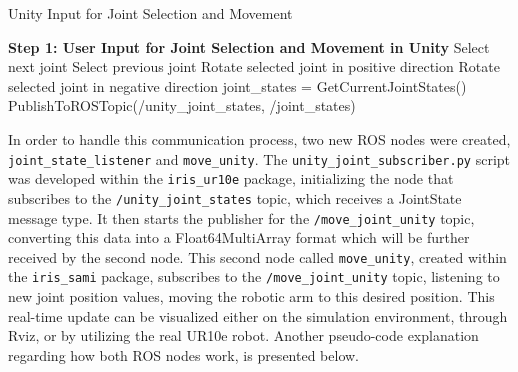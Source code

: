\begin{algorithm}
    \caption{Unity Input for Joint Selection and Movement}\label{alg:unity_input}
    \begin{algorithmic}[1]
        \State \textbf{Step 1: User Input for Joint Selection and Movement in Unity}
                \State Select next joint
                \State Select previous joint
            \EndIf
                \State Rotate selected joint in positive direction
                \State Rotate selected joint in negative direction
            \EndIf
                \State joint\_states = GetCurrentJointStates()
                \State PublishToROSTopic(/unity\_joint\_states, /joint\_states)
            \EndIf
        \EndWhile
    \end{algorithmic}
\end{algorithm}


In order to handle this communication process, two new \ac{ROS} nodes were created, \texttt{joint\_state\_listener} and \texttt{move\_unity}. The \texttt{unity\_joint\_subscriber.py} script was developed within the \texttt{iris\_ur10e} package, initializing the node that subscribes to the \texttt{/unity\_joint\_states} topic, which receives a JointState message type. It then starts the publisher for the \texttt{/move\_joint\_unity} topic, converting this data into a Float64MultiArray format which will be further received by the second node. This second node called \texttt{move\_unity}, created within the \texttt{iris\_sami} package, subscribes to the \texttt{/move\_joint\_unity} topic, listening to new joint position values, moving the robotic arm to this desired position. This real-time update can be visualized either on the simulation environment, through Rviz, or by utilizing the real UR10e robot. Another pseudo-code explanation regarding how both \ac{ROS} nodes work, is presented below.


